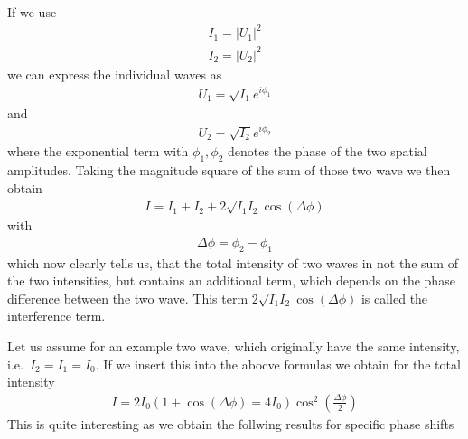 \documentclass[letterpaper,10pt,english]{sphinxmanual}
\begin{document}
If we use
\begin{equation*}
\begin{split}I_{1}=|U_1|^2\end{split}
\end{equation*}\begin{equation*}
\begin{split}I_{2}=|U_2|^2\end{split}
\end{equation*}
we can express the individual waves as
\begin{equation*}
\begin{split}U_{1}=\sqrt{I_1}e^{i\phi_1}\end{split}
\end{equation*}
and
\begin{equation*}
\begin{split}U_{2}=\sqrt{I_2}e^{i\phi_2}\end{split}
\end{equation*}
where the exponential term with \(\phi_1,\phi_2\) denotes the phase of the two spatial amplitudes. Taking the magnitude square of the sum of those two wave we then obtain
\begin{equation*}
\begin{split}I=I_{1}+I_{2}+2\sqrt{I_1 I_2}\cos(\Delta \phi)\end{split}
\end{equation*}
with
\begin{equation*}
\begin{split}\Delta \phi=\phi_{2}-\phi_1\end{split}
\end{equation*}
which now clearly tells us, that the total intensity of two waves in not the sum of the two intensities, but contains an additional term, which depends on the phase difference between the two wave. This term \(2\sqrt{I_1 I_2}\cos(\Delta \phi)\) is called the interference term.

Let us assume for an example two wave, which originally have the same intensity, i.e. \(I_2=I_1=I_0\). If we insert this into the abocve formulas we obtain for the total intensity
\begin{equation*}
\begin{split}I=2I_{0}(1+\cos(\Delta \phi)=4I_{0})\cos^2\left (\frac{\Delta \phi}{2}\right)\end{split}
\end{equation*}
This is quite interesting as we obtain the follwing results for specific phase shifts
\end{document}
